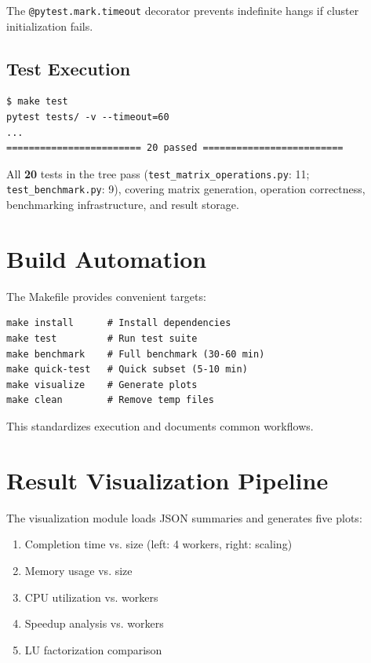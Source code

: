 The \texttt{@pytest.mark.timeout} decorator prevents indefinite hangs if cluster initialization fails.

\subsection{Test Execution}

\begin{verbatim}
$ make test
pytest tests/ -v --timeout=60
...
======================== 20 passed =========================
\end{verbatim}

All \textbf{20} tests in the tree pass (\texttt{test\_matrix\_operations.py}: 11; \texttt{test\_benchmark.py}: 9), covering matrix generation, operation correctness, benchmarking infrastructure, and result storage.

\section{Build Automation}

The Makefile provides convenient targets:

\begin{verbatim}
make install      # Install dependencies
make test         # Run test suite
make benchmark    # Full benchmark (30-60 min)
make quick-test   # Quick subset (5-10 min)
make visualize    # Generate plots
make clean        # Remove temp files
\end{verbatim}

This standardizes execution and documents common workflows.

\section{Result Visualization Pipeline}

The visualization module loads JSON summaries and generates five plots:

\begin{enumerate}
    \item Completion time vs. size (left: 4 workers, right: scaling)
    \item Memory usage vs. size
    \item CPU utilization vs. workers
    \item Speedup analysis vs. workers
    \item LU factorization comparison
\end{enumerate}

